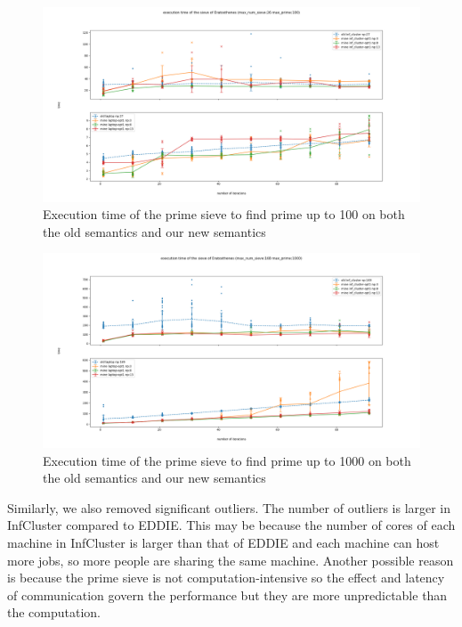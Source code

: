 \begin{figure}[h]
\centering
    \includegraphics[width=1\textwidth]{figures/sieve_opt1_100}
\caption{Execution time of the prime sieve to find prime up to 100 on both the old semantics and our new semantics}
\label{fig:sieve_opt_100}
\end{figure}

\begin{figure}[h]
\centering
    \includegraphics[width=1\textwidth]{figures/sieve_opt1_1000}
\caption{Execution time of the prime sieve to find prime up to 1000 on both the old semantics and our new semantics}
\label{fig:sieve_opt_1000}
\end{figure}

Similarly, we also removed significant outliers. The number of outliers is larger in InfCluster compared to EDDIE. This may be because the number of cores of each machine in InfCluster is larger than that of EDDIE and each machine can host more jobs, so more people are sharing the same machine. Another possible reason is because the prime sieve is not computation-intensive so the effect and latency of communication govern the performance but they are more unpredictable than the computation.

